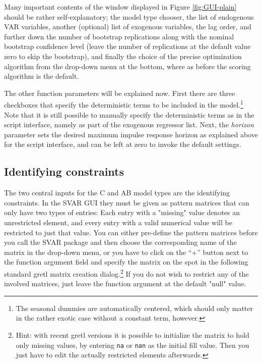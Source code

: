 \documentclass[a4paper,10pt]{article}
\newcommand{\app}[1]{\textsf{#1}}
\newcounter{script}[section]
\begin{document}
Many important contents of the window displayed in Figure
\ref{fig:GUI-plain} should be rather self-explanatory; the model type
chooser, the list of endogenous VAR variables, another (optional) list
of exogenous variables, the lag order, and further down the number of
bootstrap replications along with the nominal bootstrap confidence
level (leave the number of replications at the default value zero to
skip the bootstrap), and finally the choice of the precise
optimization algorithm from the drop-down menu at the bottom, where as
before the scoring algorithm is the default.

The other function parameters will be explained now. First there are
three checkboxes that specify the deterministic terms to be included
in the model.\footnote{The seasonal dummies are automatically
  centered, which should only matter in the rather exotic case without
  a constant term, however.} Note that it is still possible to
manually specify the deterministic terms as in the script interface,
namely as part of the exogenous regressor list. Next, the
\emph{horizon} parameter sets the desired maximum impulse response
horizon as explained above for the script interface, and can be left
at zero to invoke the default settings.

\subsection{Identifying constraints}

The two central inputs for the C and AB model types are the
identifying constraints. In the SVAR GUI they must be given as pattern
matrices that can only have two types of entries: Each entry with a
"missing" value denotes an unrestricted element, and every entry with
a valid numerical value will be restricted to just that value. You can
either pre-define the pattern matrices before you call the SVAR
package and then choose the corresponding name of the matrix in the
drop-down menu, or you have to click on the ``+'' button next to the
function argument field and specify the matrix on the spot in the
following standard \app{gretl} matrix creation dialog.\footnote{Hint:
  with recent gretl versions it is possible to initialize the matrix
  to hold only missing values, by entering \texttt{na} or \texttt{nan}
  as the initial fill value. Then you just have to edit the actually
  restricted elements afterwards.} If you do not wish to restrict any
of the involved matrices, just leave the function argument at the
default "null" value.
\end{document}
